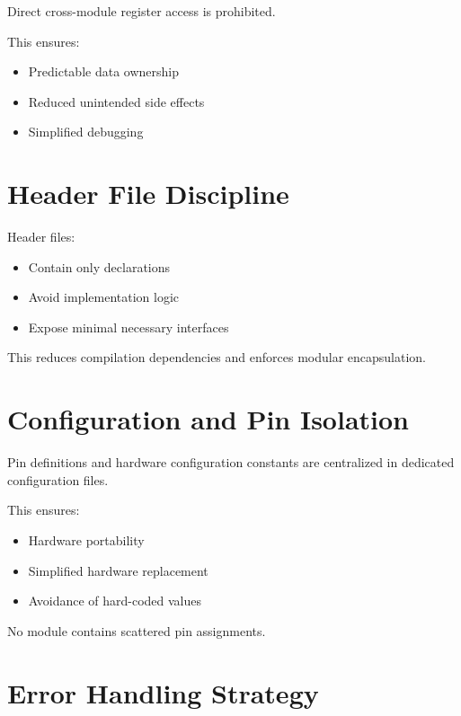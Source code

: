 Direct cross-module register access is prohibited.

This ensures:

\begin{itemize}
	\item Predictable data ownership
	\item Reduced unintended side effects
	\item Simplified debugging
\end{itemize}


\section{Header File Discipline}

Header files:

\begin{itemize}
	\item Contain only declarations
	\item Avoid implementation logic
	\item Expose minimal necessary interfaces
\end{itemize}

This reduces compilation dependencies and enforces modular encapsulation.


\section{Configuration and Pin Isolation}

Pin definitions and hardware configuration constants are centralized in dedicated configuration files.

This ensures:

\begin{itemize}
	\item Hardware portability
	\item Simplified hardware replacement
	\item Avoidance of hard-coded values
\end{itemize}

No module contains scattered pin assignments.


\section{Error Handling Strategy}

